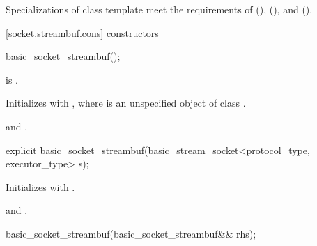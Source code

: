 \pnum
Specializations of class template  meet the requirements of  (),  (), and  ().


[socket.streambuf.cons]{ constructors}

\begin{itemdecl}
basic_socket_streambuf();
\end{itemdecl}

\begin{itemdescr}
\pnum
\constraints
{} is .

\pnum
\effects Initializes  with , where  is an unspecified object of class .

\pnum
\postconditions {} and .
\end{itemdescr}

\begin{itemdecl}
explicit basic_socket_streambuf(basic_stream_socket<protocol_type, executor_type> s);
\end{itemdecl}

\begin{itemdescr}
\pnum
\effects Initializes  with .

\pnum
\postconditions {} and .
\end{itemdescr}

\begin{itemdecl}
basic_socket_streambuf(basic_socket_streambuf&& rhs);
\end{itemdecl}

